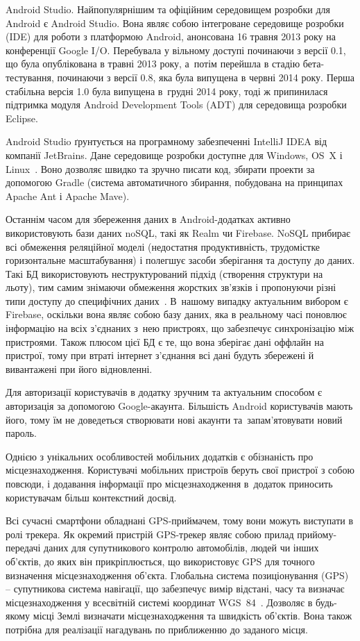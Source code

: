\documentclass[../main.tex]{subfiles}
\begin{document}
Android Studio.
Найпопулярнішим та офіційним середовищем розробки для Android є Android Studio. Вона являє собою інтегроване середовище розробки (IDE) для роботи з платформою Android, анонсована 16 травня 2013 року на конференції Google I/O. Перебувала у вільному доступі починаючи з версії 0.1, що була опублікована в травні 2013 року, а~потім перейшла в стадію бета-тестування, починаючи з версії 0.8, яка була випущена в червні 2014 року. Перша стабільна версія 1.0 була випущена в~грудні 2014 року, тоді ж припинилася підтримка модуля Android Development Tools (ADT) для середовища розробки Eclipse.

Android Studio ґрунтується на програмному забезпеченні IntelliJ IDEA від компанії JetBrains. Дане середовище розробки доступне для Windows, OS~X і Linux~\cite{android_studio}. Воно дозволяє швидко та зручно писати код, збирати проекти за допомогою Gradle (система автоматичного збирання, побудована на принципах Apache Ant і Apache Mave).

Останнім часом для збереження даних в Android-додатках активно використовують бази даних noSQL, такі як Realm чи Firebase. NoSQL прибирає всі обмеження реляційної моделі (недостатня продуктивність, трудомістке горизонтальне масштабування) і полегшує засоби зберігання та доступу до даних. Такі БД використовують неструктурований підхід (створення структури на льоту), тим самим знімаючи обмеження жорстких зв'язків і пропонуючи різні типи доступу до специфічних даних~\cite{nosql}. В~нашому випадку актуальним вибором є Firebase, оскільки вона являє собою базу даних, яка в реальному часі поновлює інформацію на всіх з'єднаних з~нею пристроях, що забезпечує синхронізацію між пристроями. Також плюсом цієї БД є те, що вона зберігає дані оффлайн на пристрої, тому при втраті інтернет з'єднання всі дані будуть збережені й вивантажені при його відновленні.

Для авторизації користувачів в додатку зручним та актуальним способом є авторизація за допомогою Google-акаунта. Більшість Android користувачів мають його, тому їм не доведеться створювати нові акаунти та~запам'ятовувати новий пароль.

Однією з унікальних особливостей мобільних додатків є обізнаність про місцезнаходження. Користувачі мобільних пристроїв беруть свої пристрої з собою повсюди, і додавання інформації про місцезнаходження в~додаток приносить користувачам більш контекстний досвід. 

Всі сучасні смартфони обладнані GPS-приймачем, тому вони можуть виступати в ролі трекера.  Як окремий пристрій GPS-трекер являє собою прилад прийому-передачі даних для супутникового контролю автомобілів, людей чи інших об'єктів, до яких він прикріплюється, що використовує GPS для точного визначення місцезнаходження об'єкта. Глобальна система позиціонування (GPS) – супутникова система навігації, що забезпечує вимір відстані, часу та визначає місцезнаходження у всесвітній системі координат WGS~84~\cite{gps}. Дозволяє в будь-якому місці Землі визначати місцезнаходження та швидкість об'єктів. Вона також потрібна для реалізації нагадувань по приближенню до заданого місця.
\end{document}
